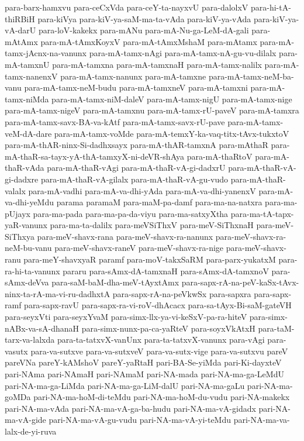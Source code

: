 {para-barx-hamxvu
para-ceCxVda
para-ceY-ta-nayxvU
para-dalolxV
para-hi-tA-thiRBiH
para-kiVya
para-kiV-ya-saM-ma-ta-vAda
para-kiV-ya-vAda
para-kiV-ya-vA-darU
para-loV-kakekx
para-mANu
para-mA-Nu-ga-LeM-dA-gali
para-mAtAmx
para-mA-tAmxKoyxV
para-mA-tAmxMshaM
para-mAtamx
para-mA-tamx-jAcnx-na-vanunx
para-mA-tamx-nAgi
para-mA-tamx-nA-gu-vu-dilalx
para-mA-tamxnU
para-mA-tamxna
para-mA-tamxnaH
para-mA-tamx-nalilx
para-mA-tamx-nanenxV
para-mA-tamx-nanunx
para-mA-tamxne
para-mA-tamx-neM-ba-vanu
para-mA-tamx-neM-budu
para-mA-tamxneV
para-mA-tamxni
para-mA-tamx-niMda
para-mA-tamx-niM-daleV
para-mA-tamx-nigU
para-mA-tamx-nige
para-mA-tamx-nigeV
para-mA-tamxnu
para-mA-tamx-rU-paveV
para-mA-tamxra
para-mA-tamx-savx-BA-va-kAtf
para-mA-tamx-savx-rU-pave
para-mA-tamx-veM-dA-dare
para-mA-tamx-voMde
para-mA-temxY-ka-vaq-titx-tAvx-tukxtoV
para-mA-thAR-ninx-Si-dadhxsayx
para-mA-thAR-tamxnA
para-mAthaR
para-mA-thaR-sa-tayx-yA-thA-tamxyX-ni-deVR-shAya
para-mA-thaRtoV
para-mA-thaR-vAda
para-mA-thaR-vAgi
para-mA-thaR-vA-gi-dadxrU
para-mA-thaR-vA-gi-dadxre
para-mA-thaR-vA-gilalx
para-mA-thaR-vA-gu-vudo
para-mA-thaR-valalx
para-mA-vadhi
para-mA-va-dhi-yAda
para-mA-va-dhi-yanenxV
para-mA-va-dhi-yeMdu
parama
paramaM
para-maM-pa-damf
para-ma-na-natxra
para-ma-pUjayx
para-ma-pada
para-ma-pa-da-viyu
para-ma-satxyXtha
para-ma-tA-tapx-yaR-vanunx
para-ma-ta-dalilx
para-meVSiThxV
para-meV-SiThxnaH
para-meV-SiThxya
para-meV-shavx-rana
para-meV-shavx-ra-nanunx
para-meV-shavx-ra-neM-bu-vanu
para-meV-shavx-raneV
para-meV-shavx-ra-nige
para-meV-shavx-ranu
para-meY-shavxyaR
paramf
para-moV-takxSaRM
para-parx-yukatxM
para-ra-hi-ta-vanunx
pararu
para-sAmx-dA-tamxnaH
para-sAmx-dA-tamxnoV
para-sAmx-deVva
para-saM-baM-dha-meV-tAyxtAmx
para-sapx-rA-na-peV-kaSx-tAvx-ninx-ta-rA-ma-vi-ru-dadhxtA
para-sapx-rA-na-peVkwSx
para-sapxra
para-sapx-ramf
para-sapx-ravU
para-sapx-ra-vi-roV-dhAcacx
para-sa-tAyx-Bi-saM-gateVH
para-seyxVti
para-seyxYvaM
para-simx-llx-ya-vi-keSxV-pa-ra-hiteV
para-simx-nABx-va-sA-dhanaH
para-simx-nunx-pa-ca-yaRteV
para-soyxVkAtxH
para-taM-tarx-va-lalxda
para-ta-tatxvX-vanUnx
para-ta-tatxvX-vanunx
para-vAgi
para-vasutx
para-va-sutxve
para-va-sutxveV
para-va-sutx-vige
para-va-sutxvu
pareV
pareVNa
pareY-kAMshoV
pareY-yaRtaH
pari-BA-Se-yiMda
pari-Ki-dayxteV
pari-NAma
pari-NAmaH
pari-NAmaM
pari-NA-mada
pari-NA-ma-ga-LeMdU
pari-NA-ma-ga-LiMda
pari-NA-ma-ga-LiM-dalU
pari-NA-ma-gaLu
pari-NA-ma-goMDa
pari-NA-ma-hoM-di-teMdu
pari-NA-ma-hoM-du-vudu
pari-NA-makekx
pari-NA-ma-vAda
pari-NA-ma-vA-ga-ba-hudu
pari-NA-ma-vA-gidadx
pari-NA-ma-vA-gide
pari-NA-ma-vA-gu-vudu
pari-NA-ma-vA-yi-teMdu
pari-NA-ma-va-lalx-de-yi-ruva
}
